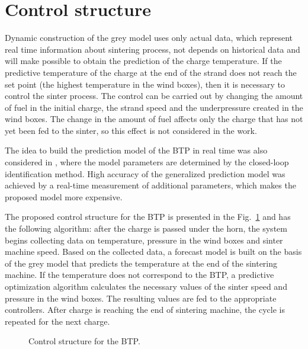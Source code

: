 \documentclass[AMS,STIX2COL]{WileyNJD-v2}
\begin{document}
\section{Control structure} \label{ControlStruct}
Dynamic construction of the grey model uses only actual data, which represent real time information about sintering process, not depends on historical data and will make possible to obtain the prediction of the charge temperature. If the predictive temperature of the charge at the end of the strand does not reach the set point (the highest temperature in the wind boxes), then it is necessary to control the sinter process. The control can be carried out by changing the amount of fuel in the initial charge, the strand speed and the underpressure created in the wind boxes. The change in the amount of fuel affects only the charge that has not yet been fed to the sinter, so this effect is not considered in the work.

The idea to build the prediction model of the BTP in real time was also considered in \cite{Wu2012a}, where the model parameters are determined by the closed-loop identification method. High accuracy of the generalized prediction model \cite{Wu2012a} was achieved by a real-time measurement of additional parameters, which makes the proposed model more expensive.

The proposed control structure for the BTP is presented in the Fig.~\ref{fig:ControlStructure} and has the following algorithm:  after the charge is passed under the horn, the system begins collecting data on temperature, pressure in the wind boxes and sinter machine speed. Based on the collected data, a forecast model is built on the basis of the grey model that predicts the temperature at the end of the sintering machine. If the temperature does not correspond to the BTP, a predictive optimization algorithm calculates the necessary values of the sinter speed and pressure in the wind boxes. The resulting values are fed to the appropriate controllers. After charge is reaching the end of sintering machine, the cycle is repeated for the next charge. 
\begin{figure}[htbp]
	\centering
	\caption{Control structure for the BTP.} \label{fig:ControlStructure}
\end{figure}
\end{document}

